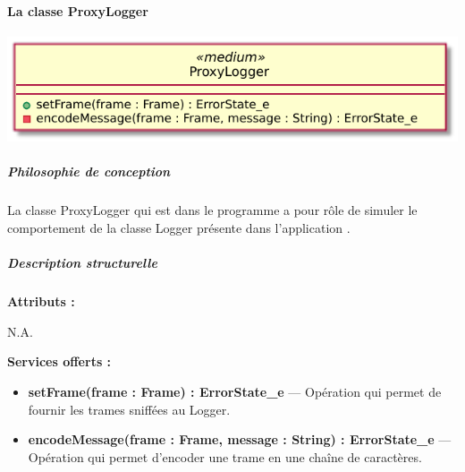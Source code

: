 \paragraph{La classe ProxyLogger}

\begin{minipage}
    {\linewidth}
    \centering
    \includegraphics[width=0.65\linewidth]{../schemas/Conception_detaillee/classe_ProxyLogger.pdf}
\end{minipage}

\subparagraph{Philosophie de conception \newline} 

\medspace

La classe ProxyLogger qui est dans le programme {\nomLogiciel} a pour rôle de simuler le comportement de la classe Logger présente dans l'application {\nomApplication}.

\subparagraph{Description structurelle \newline}

\medspace

\textbf{Attributs :}

N.A.

\textbf{Services offerts :}

\begin{itemize}
    \item \textbf{setFrame(frame : Frame) : ErrorState\_e} --- Opération qui permet de fournir les trames sniffées au Logger.
    \item \textbf{encodeMessage(frame : Frame, message : String) : ErrorState\_e} --- Opération qui permet d'encoder une trame en une chaîne de caractères.
\end{itemize}
